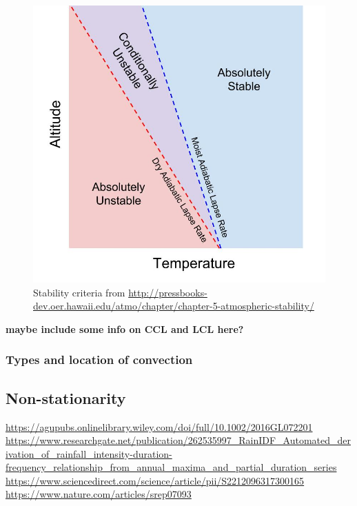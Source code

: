 \begin{figure}[hbt!]
    \centering
    \includegraphics[scale=0.3]{figures/stability_criterie.jpg}
    \caption{Stability criteria from \url{http://pressbooks-dev.oer.hawaii.edu/atmo/chapter/chapter-5-atmospheric-stability/}}
    \label{fig:stability}
\end{figure}

\textbf{maybe include some info on CCL and LCL here?}

\subsubsection{Types and location of convection}

\subsection{Non-stationarity}
\url{https://agupubs.onlinelibrary.wiley.com/doi/full/10.1002/2016GL072201} \\
\url{https://www.researchgate.net/publication/262535997_RainIDF_Automated_derivation_of_rainfall_intensity-duration-frequency_relationship_from_annual_maxima_and_partial_duration_series} \\
\url{https://www.sciencedirect.com/science/article/pii/S2212096317300165} \\
\url{https://www.nature.com/articles/srep07093}


